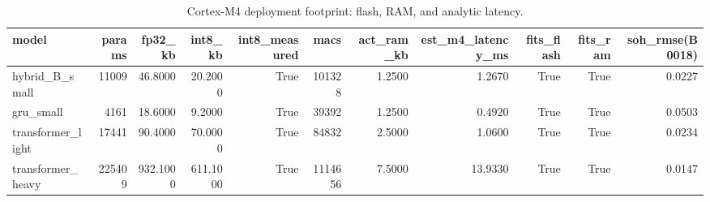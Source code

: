 \begin{table}
\caption{Cortex-M4 deployment footprint: flash, RAM, and analytic latency.}
\label{tab:cortex_m4_footprint}
\begin{tabular}{lrrrrrrrrrr}
\toprule
model & params & fp32\_kb & int8\_kb & int8\_measured & macs & act\_ram\_kb & est\_m4\_latency\_ms & fits\_flash & fits\_ram & soh\_rmse(B0018) \\
\midrule
hybrid\_B\_small & 11009 & 46.8000 & 20.2000 & True & 101328 & 1.2500 & 1.2670 & True & True & 0.0227 \\
gru\_small & 4161 & 18.6000 & 9.2000 & True & 39392 & 1.2500 & 0.4920 & True & True & 0.0503 \\
transformer\_light & 17441 & 90.4000 & 70.0000 & True & 84832 & 2.5000 & 1.0600 & True & True & 0.0234 \\
transformer\_heavy & 225409 & 932.1000 & 611.1000 & True & 1114656 & 7.5000 & 13.9330 & True & True & 0.0147 \\
\bottomrule
\end{tabular}
\end{table}
